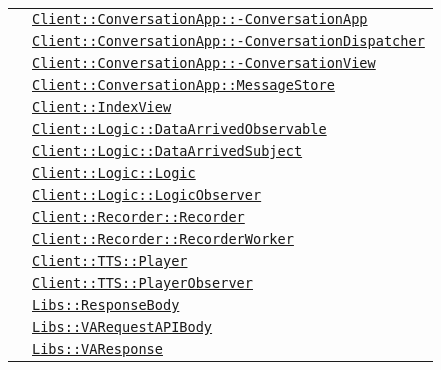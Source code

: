 \begin{longtable}{|>{\centering}m{3cm}|m{10cm}<{\centering}|}
& \hyperref[Client::ConversationApp::ConversationApp]{\texttt{Client::ConversationApp::-\linebreak ConversationApp}}\\
& \hyperref[Client::ConversationApp::ConversationDispatcher]{\texttt{Client::ConversationApp::-\linebreak ConversationDispatcher}}\\
& \hyperref[Client::ConversationApp::ConversationView]{\texttt{Client::ConversationApp::-\linebreak ConversationView}}\\
& \hyperref[Client::ConversationApp::MessageStore]{\texttt{Client::ConversationApp::MessageStore}}\\
& \hyperref[Client::IndexView]{\texttt{Client::IndexView}}\\
& \hyperref[Client::Logic::DataArrivedObservable]{\texttt{Client::Logic::DataArrivedObservable}}\\
& \hyperref[Client::Logic::DataArrivedSubject]{\texttt{Client::Logic::DataArrivedSubject}}\\
& \hyperref[Client::Logic::Logic]{\texttt{Client::Logic::Logic}}\\
& \hyperref[Client::Logic::LogicObserver]{\texttt{Client::Logic::LogicObserver}}\\
& \hyperref[Client::Recorder::Recorder]{\texttt{Client::Recorder::Recorder}}\\
& \hyperref[Client::Recorder::RecorderWorker]{\texttt{Client::Recorder::RecorderWorker}}\\
& \hyperref[Client::TTS::Player]{\texttt{Client::TTS::Player}}\\
& \hyperref[Client::TTS::PlayerObserver]{\texttt{Client::TTS::PlayerObserver}}\\
& \hyperref[Libs::ResponseBody]{\texttt{Libs::ResponseBody}}\\
& \hyperref[Libs::VARequestAPIBody]{\texttt{Libs::VARequestAPIBody}}\\
& \hyperref[Libs::VAResponse]{\texttt{Libs::VAResponse}}\\ \hline


\end{longtable}
